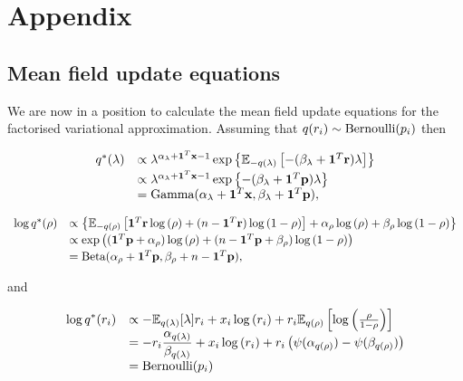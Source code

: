 \documentclass{article}[12pt]
\begin{document}
\section{Appendix} 

\subsection{Mean field update equations}
We are now in a position to calculate the mean field update equations for the factorised
variational approximation. Assuming that $q(r_i) \sim \text{Bernoulli} (p_i)$ then

$$
\begin{array}{rl}
q^*(\lambda)
    & \propto 
    \lambda^{\alpha_\lambda+{\bf 1}^T{\bf x} - 1} 
    \exp\left\{ 
    {\mathbb E}_{-q(\lambda)} \left[
    -(\beta_\lambda + {\bf 1}^T{\bf r}) \lambda 
    \right] 
    \right\} 
    \\ [0.5ex]
    &
    \propto \lambda^{\alpha_\lambda+{\bf 1}^T{\bf x} - 1} \exp{\left \{-(\beta_\lambda + {\bf1}^T{\bf p})\lambda \right \} } 
\\
    & = \text{Gamma} (\alpha_\lambda+{\bf 1}^T{\bf x}, \beta_\lambda+{\bf 1}^T{\bf p}),
\end{array}
$$

$$
\begin{array}{rl}
\log{q^*(\rho)} 
    &
    \propto \left\{ 
    {\mathbb E}_{-q(\rho)}\left[ 
    {\bf 1}^T{\bf r} \log{(\rho)} 
    + (n - {\bf 1}^T{\bf r}) \log{(1 - \rho)} 
    \right] 
    + \alpha_\rho \log{(\rho)} 
    + \beta_\rho \log{(1 - \rho)} 
    \right\} 
    \\ [0.5ex]
    &
    \propto \exp \left( 
    ({\bf 1}^T{\bf p} + \alpha_\rho) \log{(\rho)} 
    + (n - {\bf 1}^T{\bf p} + \beta_\rho) \log{(1 - \rho)} 
    \right) 
    \\ [0.5ex]
    &= \text{Beta} (\alpha_\rho + {\bf 1}^T{\bf p}, \beta_\rho + n - {\bf 1}^T{\bf p}),
\end{array}
$$

\noindent and

$$
\begin{array}{rl}
\ds \log{q^*(r_i)} &\propto -\bE_{q(\lambda)} [\lambda ] r_i + x_i \log{(r_i)} + r_i \bE_{q(\rho)} \left[\log{\left(\frac{\rho}{1 - \rho}\right)}\right]\\[0.5ex]
& \ds = -r_i \frac{\alpha_{q(\lambda)}}{\beta_{q(\lambda)}} + x_i \log{(r_i)} + r_i \left(\psi(\alpha_{q(\rho)}) - \psi(\beta_{q(\rho)})\right)\\ [0.5ex]%
& \ds = \text{Bernoulli}(p_i)
\end{array}
$$
\end{document}
